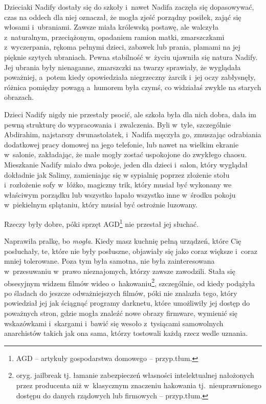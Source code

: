 \documentclass[oneside,polish,11pt,sfheadings]{mwbk}
\begin{document}
Dzieciaki Nadify dostały się do szkoły i~nawet Nadifa zaczęła się
dopasowywać, czas na oddech dla niej oznaczał, że mogła zjeść porządny
posiłek, zająć się włosami i~ubraniami. Zawsze miała królewską postawę,
ale walczyła z~naturalnym, przeciążonym, opadaniem ramion matki,
zmarszczkami z~wyczerpania, rękoma pełnymi dzieci, zabawek lub prania,
plamami na jej pięknie szytych ubraniach. Pewna stabilność w~życiu
ujawniła się natura Nadify. Jej ubrania były nienaganne, zmarszczki na
twarzy sprawiały, że wyglądała poważniej, a~potem kiedy opowiedziała
niegrzeczny żarcik i~jej oczy zabłysnęły, różnica pomiędzy powagą a~humorem była czymś, co widziałaś zwykle na starych obrazach.

Dzieci Nadify nigdy nie przestały psocić, ale szkoła była dla nich
dobra, dała im pewną strukturę do wypracowania i~zwalczenia. Byli w~tyle, szczególnie Abdirahim, najstarszy dwunastolatek, i~Nadifa męczyła
go, zmuszając odrabiania dodatkowej pracy domowej na jego telefonie, lub
nawet na wielkim ekranie w~salonie, zakładając, że małe mogły zostać
uspokojone do zwykłego chaosu. Mieszkanie Nadify miało dwa pokoje, jeden
dla dzieci i~salon, który wyglądał dokładnie jak Salimy, zamieniając się
w sypialnię poprzez złożenie stołu i~rozłożenie sofy w~łóżko, magiczny
trik, który musiał być wykonany we właściwym porządku lub wszystko
łapało wszystko inne w~środku pokoju w~piekielnym splątaniu, który
musiał być ostrożnie luzowany.

Rzeczy były dobre, póki sprzęt AGD\footnote{ AGD -- artykuły gospodarstwa
domowego -- przyp.tłum.} nie przestał jej słuchać.

Naprawiła pralkę, bo \textit{mogła}. Kiedy masz kuchnię pełną urządzeń,
które Cię posłuchały, te, które nie były posłuszne, objawiały się jako
coraz większe i~coraz mniej tolerowane. Poza tym była samotna, nie była
zainteresowana w~przesuwaniu w~prawo nieznajomych, którzy zawsze
zawodzili. Stała się obsesyjnym widzem filmów wideo o~hakowaniu\footnote{oryg.
jailbreak tj. łamanie zabezpieczeń własności intelektualnej nałożonych
przez producenta niż w~klasycznym znaczeniu hakowania
tj.~nieuprawnionego dostępu do danych rządowych lub
firmowych -- przyp.tłum.}, szczególnie, od kiedy podążyła po śladach do
jeszcze odważniejszych filmów, póki nie znalazła tego, który powiedział
jej jak ściągnąć programy darknetu, które umożliwiły jej dostęp do
poważnych stron, gdzie mogła znaleźć nowe obrazy firmware, wymienić się
wskazówkami i~skargami i~bawić się wesoło z~tysiącami samowolnych
anarchistów takich jak ona sama, którzy tostowali każdą rzecz wedle
uznania.
\end{document}

